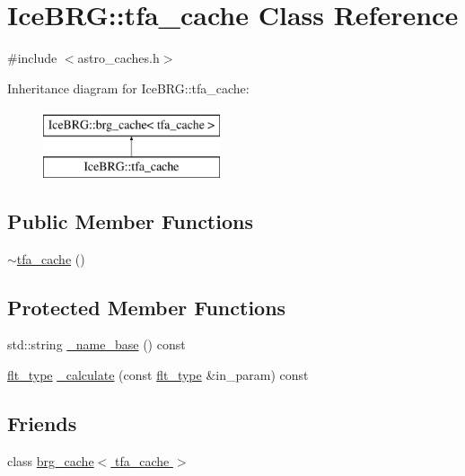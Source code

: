 \hypertarget{classIceBRG_1_1tfa__cache}{}\section{Ice\+B\+R\+G\+:\+:tfa\+\_\+cache Class Reference}
\label{classIceBRG_1_1tfa__cache}


{\ttfamily \#include $<$astro\+\_\+caches.\+h$>$}

Inheritance diagram for Ice\+B\+R\+G\+:\+:tfa\+\_\+cache\+:\begin{figure}[H]
\begin{center}
\leavevmode
\includegraphics[height=2.000000cm]{classIceBRG_1_1tfa__cache}
\end{center}
\end{figure}
\subsection*{Public Member Functions}
\begin{DoxyCompactItemize}
\item 
\hyperlink{classIceBRG_1_1tfa__cache_ae75dedf37bbe634756a244a2b6a5d370}{$\sim$tfa\+\_\+cache} ()
\end{DoxyCompactItemize}
\subsection*{Protected Member Functions}
\begin{DoxyCompactItemize}
\item 
std\+::string \hyperlink{classIceBRG_1_1tfa__cache_a2ba816e8b181268c233a49999264381f}{\+\_\+name\+\_\+base} () const 
\item 
\hyperlink{lib_2IceBRG__main_2common_8h_ad0f130a56eeb944d9ef2692ee881ecc4}{flt\+\_\+type} \hyperlink{classIceBRG_1_1tfa__cache_a471aa05a4cc82e4a9007ab365c6a19cb}{\+\_\+calculate} (const \hyperlink{lib_2IceBRG__main_2common_8h_ad0f130a56eeb944d9ef2692ee881ecc4}{flt\+\_\+type} \&in\+\_\+param) const 
\end{DoxyCompactItemize}
\subsection*{Friends}
\begin{DoxyCompactItemize}
\item 
class \hyperlink{classIceBRG_1_1tfa__cache_a2ba9ba582d5f67ff2b264f742b3d251f}{brg\+\_\+cache$<$ tfa\+\_\+cache $>$}
\end{DoxyCompactItemize}



